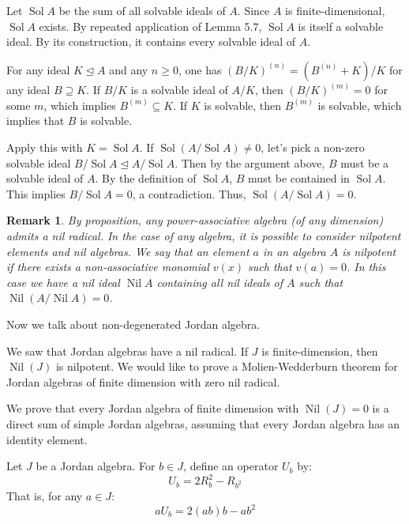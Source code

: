 \documentclass{article}
\newtheorem{remark}[theorem]{Remark}
\begin{document}
 
Let $\operatorname{Sol} A$ be the sum of all solvable ideals of $A$. Since $A$ is finite-dimensional, $ \operatorname{Sol}A $ exists. By repeated application of Lemma 5.7, $\operatorname{Sol} A$ is itself a solvable ideal. By its construction, it contains every solvable ideal of $A$.  

For any ideal $K \trianglelefteq A$ and any $n \ge 0$, one has $(B/K)^{(n)} = (B^{(n)} + K)/K$ for any ideal $B \supseteq K$. If $B/K$ is a solvable ideal of $A/K$, then $(B/K)^{(m)} = 0$ for some $m$, which implies $B^{(m)} \subseteq K$. If $K$ is solvable, then $B^{(m)}$ is solvable, which implies that $B$ is solvable.   

Apply this with $K = \operatorname{Sol} A$. If $\operatorname{Sol}(A/\operatorname{Sol} A) \neq 0$, let's pick a non-zero solvable ideal $B/ \operatorname{Sol} A \trianglelefteq A/\operatorname{Sol} A$. Then by the argument above, $B$ must be a solvable ideal of $A$. By the definition of $\operatorname{Sol} A$, $B$ must be contained in $\operatorname{Sol} A$. This implies $B/\operatorname{Sol} A = 0$, a contradiction. Thus, $\operatorname{Sol}(A/\operatorname{Sol} A) = 0$.  

\begin{remark}
By proposition, any power-associative algebra (of any dimension) admits a nil radical. In the case of any algebra, it is possible to consider nilpotent elements and nil algebras. We say that an element $a$ in an algebra $A$ is nilpotent if there exists a non-associative monomial $v(x)$ such that $v(a)=0$. In this case we have a nil ideal $\operatorname{Nil} A$ containing all nil ideals of $A$ such that $\operatorname{Nil}(A/\operatorname{Nil} A) = 0$.  
\end{remark}    

Now we talk about non-degenerated Jordan algebra.

We saw that Jordan algebras have a nil radical. If $J$ is finite-dimension, then $\operatorname{Nil}(J)$ is nilpotent. We would like to prove a Molien-Wedderburn theorem for Jordan algebras of finite dimension with zero nil radical.  

We prove that every Jordan algebra of finite dimension with $\operatorname{Nil}(J) = 0$ is a direct sum of simple Jordan algebras, assuming that every Jordan algebra has an identity element.  

Let $J$ be a Jordan algebra. For $b \in J$, define an operator $U_b$ by:  
\[ U_b = 2R_b^2 - R_{b^2}  \]  
That is, for any $a \in J$:  
\[ aU_b = 2(ab)b - ab^2 \]  
\end{document}
